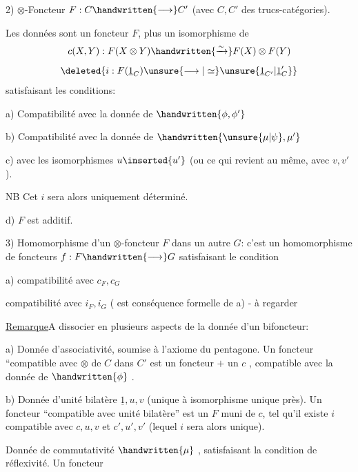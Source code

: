 
2) $\otimes$-Foncteur $F:C\handwritten{\longrightarrow}C'$ (avec $C,C'$ des trucs-catégories).

Les données sont un foncteur  $F$, plus un isomorphisme de 
\[
c(X,Y):F(X\otimes Y)\handwritten{\xrightarrow{\sim}}F(X)\otimes F(Y)
\]
\[
\deleted{i:F(\underline{1}_C)\unsure{\longrightarrow|\simeq}\unsure{\underline{1}_{C'}|\underline{1}'_C}}
\]
satisfaisant les conditions:

a) Compatibilité  avec la donnée de $\handwritten{\phi,\phi'}$

b) Compatibilité  avec la donnée de $\handwritten{\unsure{\mu|\psi},\mu'}$

c)  avec les isomorphismes $u\inserted{u'}$ (ou ce  qui revient au même, avec  $v,v'$).

NB Cet $i$ sera alors uniquement déterminé.

d) $F$ est additif.

3) Homomorphisme d'un $\otimes$-foncteur $F$ dans un autre $G$: c'est un homomorphisme de foncteurs $f:F\handwritten{\longrightarrow}G$ satisfaisant le condition

a) compatibilité avec  $c_F,c_G$


 compatibilité avec $i_F,i_G$ ( est  conséquence formelle de a) - à regarder\deleted{)}

 \uline{Remarque}\qquad A dissocier  en plusieurs aspects de la donnée d'un bifoncteur\handwritten{$\otimes$}:

a) Donnée d'associativité, soumise à l'axiome du pentagone. Un foncteur ``compatible avec $\otimes$ de $C$ dans $C'$ est un foncteur $+$ un $c$ , compatible avec la donnée de $\handwritten{\phi}$ .

b) Donnée d'unité bilatère $\underline{1},u,v$ (unique à isomorphisme unique près). Un foncteur ``compatible avec  unité bilatère'' est un $F$ muni de $c$, tel qu'il existe $i$ compatible avec $c,u,v$ et $c',u',v'$ (lequel $i$ sera alors unique).


 Donnée de commutativité $\handwritten{\mu}$ , satisfaisant la condition de réflexivité.\deleted{(} Un foncteur
